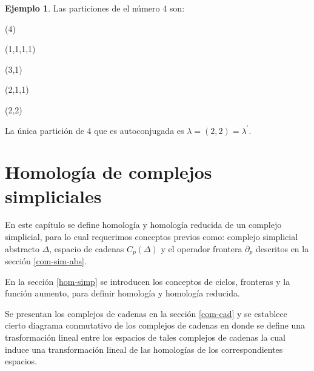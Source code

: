 \documentclass[12pt]{book}
\theoremstyle{definition}
\newtheorem{example}[theorem]{Ejemplo}
\newcounter{in}
\newcounter{ini}
\begin{document}
\begin{example}Las particiones de el número 4 son:
  \begin{center}
    \begin{minipage}[h]{0.2\linewidth}
      \centering {}

      (4)
    \end{minipage}
    \begin{minipage}[h]{0.15\linewidth}
      \centering {}

      (1,1,1,1)
    \end{minipage}
    \begin{minipage}[h]{0.2\linewidth}
      \centering {}
      
      (3,1)
    \end{minipage}
    \begin{minipage}[h]{0.2\linewidth}
      \centering {}
      
      (2,1,1)
    \end{minipage}
    \begin{minipage}[h]{0.2\linewidth}
      \centering {}
      
      (2,2)
    \end{minipage}
  \end{center}
 La única partición de 4 que es autoconjugada es $\lambda=(2,2)=\lambda^{'}$.
\end{example}

\chapter{Homología de complejos simpliciales}
\label{cha:hom-com-sim}

En este capítulo se define homología  y homología reducida de un
complejo simplicial, para lo cual requerimos conceptos previos como:
complejo simplicial abstracto $\Delta$, espacio de cadenas $C_{p}(\Delta)$ y el
operador frontera $\partial_{p}$ descritos en la sección
\ref{com-sim-abs}. 

En la sección \ref{hom-simp} se introducen los conceptos de ciclos, fronteras y la
función aumento, para definir homología y homología reducida.

Se presentan los complejos de cadenas en la sección \ref{com-cad} y se
establece cierto diagrama conmutativo de los complejos de cadenas en donde
se define una trasformación lineal entre los espacios de tales
complejos de cadenas la cual induce una transformación lineal de las homologías
de los correspondientes espacios.
\end{document}

